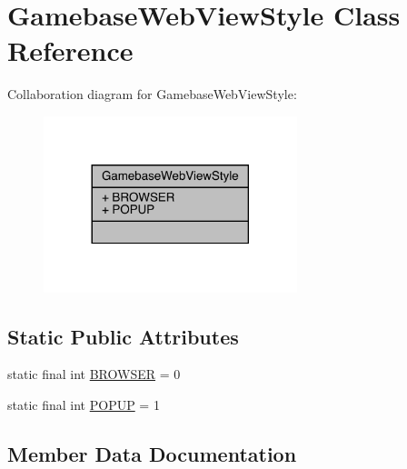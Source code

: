\hypertarget{classcom_1_1toast_1_1android_1_1gamebase_1_1_gamebase_web_view_style}{}\section{Gamebase\+Web\+View\+Style Class Reference}
\label{classcom_1_1toast_1_1android_1_1gamebase_1_1_gamebase_web_view_style}


Collaboration diagram for Gamebase\+Web\+View\+Style\+:
\nopagebreak
\begin{figure}[H]
\begin{center}
\leavevmode
\includegraphics[width=209pt]{classcom_1_1toast_1_1android_1_1gamebase_1_1_gamebase_web_view_style__coll__graph}
\end{center}
\end{figure}
\subsection*{Static Public Attributes}
\begin{DoxyCompactItemize}
\item 
static final int \hyperlink{classcom_1_1toast_1_1android_1_1gamebase_1_1_gamebase_web_view_style_a9d77e4ec2a62b4956caade68b902c6fd}{B\+R\+O\+W\+S\+ER} = 0
\item 
static final int \hyperlink{classcom_1_1toast_1_1android_1_1gamebase_1_1_gamebase_web_view_style_ab0de9a5424b730e4b0a945d343f69ebe}{P\+O\+P\+UP} = 1
\end{DoxyCompactItemize}


\subsection{Member Data Documentation}
\mbox{\label{classcom_1_1toast_1_1android_1_1gamebase_1_1_gamebase_web_view_style_a9d77e4ec2a62b4956caade68b902c6fd}} 
